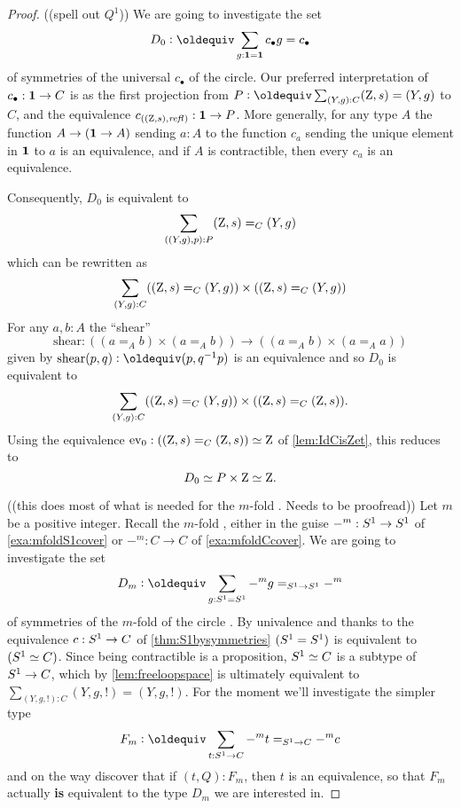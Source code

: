   \begin{proof}
  ((spell out $Q^1$))
We are going to investigate the set 
$$D_0\defequi\sum_{g:\bn 1=\bn 1}c_\bullet g=c_\bullet$$ 
of symmetries of the universal \covering $c_\bullet$ of the circle.  
Our preferred interpretation of $c_\bullet:\mathbf{1}\to C$ is as the first projection from $P\defequi\sum_{(Y,g):C}(\zet,s)=(Y,g)$ to $C$, and the equivalence $c_{((\mathrm{Z},s),\mathop{{\it refl}_{}})}:\mathbf{1}\to P$. %
More generally, for any type $A$ the function $A\to(\mathbf{1}\to A)$ sending $a:A$ to the function $c_a$ sending the unique element in $\mathbf{1}$ to $a$ is an equivalence, and if $A$ is contractible, then every $c_a$ is an equivalence.

   Consequently, $D_0$ is equivalent to
$$\sum_{((Y,g),p):P}(\mathrm{Z},s)=_C(Y,g)$$ 
which can be rewritten as
$$\sum_{(Y,g):C}((\mathrm{Z},s)=_C(Y,g))\times((\mathrm{Z},s)=_C(Y,g))
$$
For any $a,b:A$ the ``shear'' 
$$\mathrm{shear}:((a=_Ab)\times(a=_Ab))\to((a=_Ab)\times(a=_Aa))$$ 
given by $\mathrm{shear}(p,q)\defequi(p,q^{-1}p)$
is an equivalence and
so $D_0$ is equivalent to 
$$\sum_{(Y,g):C}((\mathrm{Z},s)=_C(Y,g))\times ((\mathrm{Z},s)=_C(\mathrm{Z},s)).
$$
Using the equivalence $\mathrm{ev}_0:((\mathrm{Z},s)=_C(\mathrm{Z},s))\simeq\mathrm{Z}$ of \cref{lem:IdCisZet}, this
 reduces to 
$$D_0\simeq P\times\mathrm{Z}\simeq\mathrm{Z}.$$
    
((this does most of what is needed for the $m$-fold \covering.  Needs to be proofread))
    Let $m$ be a positive integer.  
Recall the $m$-fold \covering, either in the guise $-^m:{S^1}\to {S^1}$ of \cref{exa:mfoldS1cover} or $-^m:C\to C$ of \cref{exa:mfoldCcover}.
We are going to investigate the set
$$D_m\defequi\sum_{g:\Sc=\Sc}-^mg=_{\Sc\to \Sc}-^m$$  
of symmetries of the $m$-fold \covering of the circle%
.  
By univalence and thanks to the equivalence $c:{S^1}\to C$ of \cref{thm:S1bysymmetries} $({S^1}= {S^1})$ is equivalent to $({S^1}\simeq C)$.
Since being contractible is a proposition, ${S^1}\simeq C$ is a subtype of ${S^1}\to C$,
which by \cref{lem:freeloopspace} is ultimately equivalent to $\sum_{(Y,g,!):C}(Y,g,!)=(Y,g,!)$. 
For the moment we'll investigate the simpler type 
$$F_m\defequi\sum_{t:\Sc\to C}-^mt=_{\Sc\to C}-^mc$$
and on the way discover that if $(t,Q):F_m$, then $t$ is an equivalence, so that $F_m$ actually {\bf is} equivalent to the type $D_m$ we are interested in.


\end{proof}
